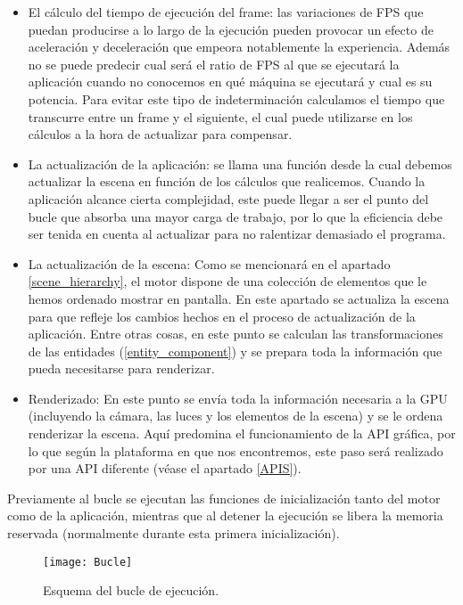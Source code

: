 \begin{itemize}
    \item El cálculo del tiempo de ejecución del frame: las variaciones de FPS que puedan producirse a lo largo de la ejecución pueden provocar un efecto de aceleración y deceleración que empeora notablemente la experiencia. Además no se puede predecir cual será el ratio de FPS al que se ejecutará la aplicación cuando no conocemos en qué máquina se ejecutará y cual es su potencia. Para evitar este tipo de indeterminación calculamos el tiempo que transcurre entre un frame y el siguiente, el cual puede utilizarse en los cálculos a la hora de actualizar para compensar.
    \item La actualización de la aplicación: se llama una función desde la cual debemos actualizar la escena en función de los cálculos que realicemos. Cuando la aplicación alcance cierta complejidad, este puede llegar a ser el punto del bucle que absorba una mayor carga de trabajo, por lo que la eficiencia debe ser tenida en cuenta al actualizar para no ralentizar demasiado el programa.
    \item La actualización de la escena: Como se mencionará en el apartado \ref{scene_hierarchy}, el motor dispone de una colección de elementos que le hemos ordenado mostrar en pantalla. En este apartado se actualiza la escena para que refleje los cambios hechos en el proceso de actualización de la aplicación. Entre otras cosas, en este punto se calculan las transformaciones de las entidades (\ref{entity_component}) y se prepara toda la información que pueda necesitarse para renderizar.
    \item Renderizado: En este punto se envía toda la información necesaria a la GPU (incluyendo la cámara, las luces y los elementos de la escena) y se le ordena renderizar la escena. Aquí predomina el funcionamiento de la API gráfica, por lo que según la plataforma en que nos encontremos, este paso será realizado por una API diferente (véase el apartado \ref{APIS}).
\end{itemize}

Previamente al bucle se ejecutan las funciones de inicialización tanto del motor como de la aplicación, mientras que al detener la ejecución se libera la memoria reservada (normalmente durante esta primera inicialización).

\begin{figure}[H]
    \centering
    \texttt{[image: Bucle]}
    \caption{Esquema del bucle de ejecución.}
    \label{fig:bucle}
\end{figure}

